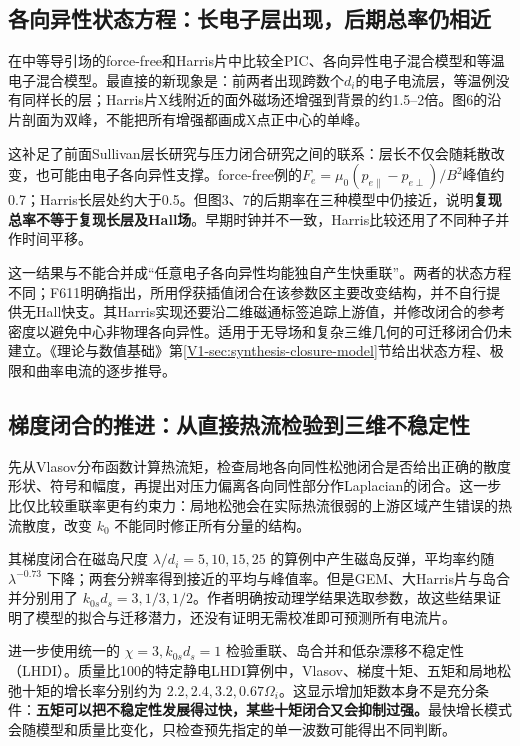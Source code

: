 \documentclass[UTF8,a4paper,11pt,openany,fontset=fandol]{ctexbook}
\begin{document}
\subsection{各向异性状态方程：长电子层出现，后期总率仍相近}\label{sec:synthesis-anisotropy}
\citet{F611}在中等导引场的force-free和Harris片中比较全PIC、各向异性电子混合模型和等温电子混合模型。最直接的新现象是：前两者出现跨数个$d_i$的电子电流层，等温例没有同样长的层；Harris片X线附近的面外磁场还增强到背景的约1.5--2倍。图6的沿片剖面为双峰，不能把所有增强都画成X点正中心的单峰。

这补足了前面Sullivan层长研究与压力闭合研究之间的联系：层长不仅会随耗散改变，也可能由电子各向异性支撑。force-free例的$F_e=\mu_0(p_{e\parallel}-p_{e\perp})/B^2$峰值约0.7；Harris长层处约大于0.5。但图3、7的后期率在三种模型中仍接近，说明\textbf{复现总率不等于复现长层及Hall场}。早期时钟并不一致，Harris比较还用了不同种子并作时间平移。

这一结果与\citet{Cassak2015}不能合并成“任意电子各向异性均能独自产生快重联”。两者的状态方程不同；F611明确指出，所用俘获插值闭合在该参数区主要改变结构，并不自行提供无Hall快支。其Harris实现还要沿二维磁通标签追踪上游值，并修改闭合的参考密度以避免中心非物理各向异性。适用于无导场和复杂三维几何的可迁移闭合仍未建立。《理论与数值基础》第\ref{V1-sec:synthesis-closure-model}节给出状态方程、极限和曲率电流的逐步推导。

\subsection{梯度闭合的推进：从直接热流检验到三维不稳定性}
\citet{L256}先从Vlasov分布函数计算热流矩，检查局地各向同性松弛闭合是否给出正确的散度形状、符号和幅度，再提出对压力偏离各向同性部分作Laplacian的闭合。这一步比仅比较重联率更有约束力：局地松弛会在实际热流很弱的上游区域产生错误的热流散度，改变 $k_0$ 不能同时修正所有分量的结构。

其梯度闭合在磁岛尺度 $\lambda/d_i=5,10,15,25$ 的算例中产生磁岛反弹，平均率约随 $\lambda^{-0.73}$ 下降；两套分辨率得到接近的平均与峰值率。但是GEM、大Harris片与岛合并分别用了 $k_{0s}d_s=3,1/3,1/2$。作者明确按动理学结果选取参数，故这些结果证明了模型的拟合与迁移潜力，还没有证明无需校准即可预测所有电流片。

\citet{E552}进一步使用统一的 $\chi=3,k_{0s}d_s=1$ 检验重联、岛合并和低杂漂移不稳定性（LHDI）。质量比100的特定静电LHDI算例中，Vlasov、梯度十矩、五矩和局地松弛十矩的增长率分别约为 $2.2,2.4,3.2,0.67\Omega_i$。这显示增加矩数本身不是充分条件：\textbf{五矩可以把不稳定性发展得过快，某些十矩闭合又会抑制过强。}最快增长模式会随模型和质量比变化，只检查预先指定的单一波数可能得出不同判断。
\end{document}
